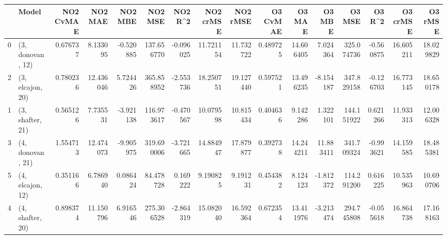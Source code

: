 \begin{tabular}{llrrrrrrrrrrrrrr}
\toprule
{} &             Model &  NO2 CvMAE &    NO2 MAE &   NO2 MBE &     NO2 MSE &   NO2 R\textasciicircum2 &  NO2 crMSE &   NO2 rMSE &  O3 CvMAE &     O3 MAE &     O3 MBE &      O3 MSE &    O3 R\textasciicircum2 &   O3 crMSE &    O3 rMSE \\
\midrule
0 &  (3, donovan, 12) &   0.676737 &   8.133095 & -0.520885 &  137.656770 & -0.096025 &  11.721154 &  11.732722 &  0.489725 &  14.606405 &   7.024364 &  325.074736 & -0.560875 &  16.605211 &  18.029829 \\
2 &  (3, elcajon, 20) &   0.780236 &  12.436046 &  5.724426 &  365.858952 & -2.553736 &  18.250751 &  19.127440 &  0.597521 &  13.496235 &  -8.154187 &  347.829158 & -0.126703 &  16.773145 &  18.650178 \\
1 &  (3, shafter, 21) &   0.565126 &   7.735531 & -3.921138 &  116.973617 & -0.470567 &  10.079598 &  10.815434 &  0.404636 &   9.142286 &   1.322101 &  144.151922 &  0.621266 &  11.933313 &  12.006328 \\
3 &  (4, donovan, 21) &   1.554713 &  12.474073 & -9.905975 &  319.690006 & -3.721665 &  14.884947 &  17.879877 &  0.392738 &  14.244211 &  11.883411 &  341.709324 & -0.993621 &  14.159585 &  18.485381 \\
5 &  (4, elcajon, 12) &   0.351166 &   6.786940 &  0.086424 &   84.478728 &  0.169222 &   9.190825 &   9.191231 &  0.454382 &   8.124123 &  -1.812372 &  114.291200 &  0.616225 &  10.535963 &  10.690706 \\
4 &  (4, shafter, 20) &   0.898374 &  11.150796 &  6.916546 &  275.306528 & -2.864319 &  15.082040 &  16.592364 &  0.672354 &  13.411976 &  -3.213474 &  294.745808 & -0.055618 &  16.864738 &  17.168163 \\
\bottomrule
\end{tabular}
